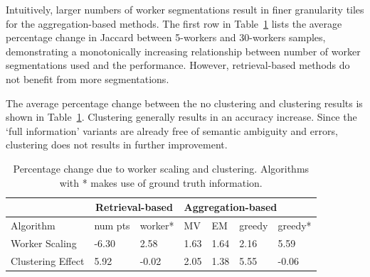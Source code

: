 \par \noindent Intuitively, larger numbers of worker segmentations result in finer granularity tiles for the aggregation-based methods. The first row in Table~\ref{statsTable} lists the average percentage change in Jaccard between 5-workers and 30-workers samples, demonstrating a monotonically increasing relationship between number of worker segmentations used and the performance. However, retrieval-based methods do not benefit from more segmentations.

\par \noindent The average percentage change between the no clustering and clustering results is shown in Table~\ref{statsTable}. Clustering generally results in an accuracy increase. Since the `full information' variants are already free of semantic ambiguity and errors, clustering does not results in further improvement. %
\begin{table}[h!]
   \small
     \setlength\tabcolsep{1.5pt}
      \begin{tabular}{l|l|l|l|l|l|l}
         & \multicolumn{2}{c|}{Retrieval-based} & \multicolumn{4}{l}{Aggregation-based} \\ \hline
      Algorithm         & num pts         & worker*        & MV    & EM    & greedy  & greedy*  \\ \hline
      Worker Scaling    & -6.30           & 2.58               & 1.63  & 1.64  & 2.16    & 5.59         \\ \hline
      Clustering Effect & 5.92            & -0.02              & 2.05  & 1.38  & 5.55    & -0.06       
      \end{tabular}
      \caption{Percentage change due to worker scaling and clustering. Algorithms with * makes use of ground truth information.}
      \label{statsTable}
\end{table}